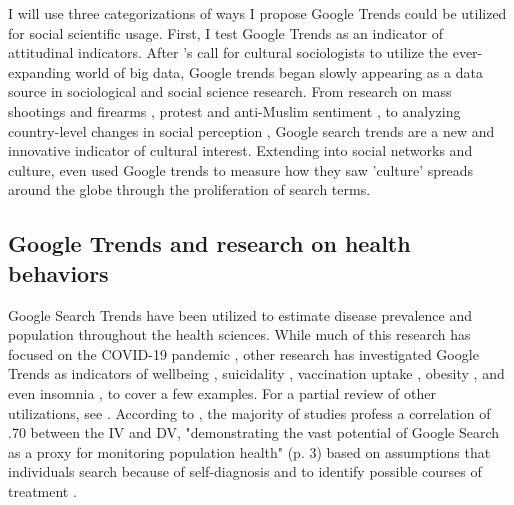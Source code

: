 I will use three categorizations of ways I propose Google Trends could
be utilized for social scientific usage. First, I test Google
Trends as an indicator of attitudinal indicators. 
After \citet{bailCulturalEnvironmentMeasuring2014}'s call for
cultural sociologists to utilize the ever-expanding world of big data,
Google trends began slowly appearing as a data source in sociological and
social science research. From research on mass shootings and firearms \citep{brownsteinInternetSearchPatterns2020, semenzaInformationseekingWakeTragedy2020}, 
protest and anti-Muslim sentiment \citep{bailUsingInternetSearch2018,barrieSearchingRacismGeorge2020,grossThereFergusonEffect2017},
to analyzing country-level changes in social perception \citep{reyes_etal18},
Google search trends are a new and innovative indicator of cultural interest.
Extending into social networks and culture, \citet{bailPrestigeProximityPrejudice2019}
even used Google trends to measure how they saw 'culture' spreads around the globe
through the proliferation of search terms.

\subsection{Google Trends and research on health behaviors}

Google Search Trends have been utilized to estimate disease prevalence
and population throughout the health sciences. While much of this research has focused on
the COVID-19 pandemic \citep{jimenez_etal20, jimenezCOVID19SymptomGoogle2020, limEstimatingInformationSeekingBehaviour2020, mavraganiCOVID19PredictabilityUnited2020, nguyenGoogleTrendsAnalysis2020, todorovaInternetBasedData2021, mingUnderstandingHealthCommunication2021},
other research has investigated Google Trends as indicators of wellbeing
\citep{brodeurCOVID19LockdownsWellbeing2021, carpiTwitterSubjectiveWellBeing2020, duCOVID19IncreasesOnline2020},
suicidality \citep{burnettTimeTrendsPublic2020}, 
vaccination uptake \citep{dalumhansenEnsembleLearnedVaccination2016}, 
obesity \citep{sarigulNowcastingObesityUsing2014}, 
and even insomnia \citep{zittingGoogleTrendsReveal2020},
to cover a few examples. For a partial review of other utilizations, see \citet{nutiUseGoogleTrends2014}. According to \citet{jaidkaInformationseekingVsSharing2021}, the majority of studies profess
a correlation of \> .70 between the IV and DV, "demonstrating the vast potential of Google
Search as a proxy for monitoring population health" (p. 3) based on
assumptions that individuals search because of self-diagnosis and to
identify possible courses of treatment \citep{dechoudhurySeekingSharingHealth2014}.


